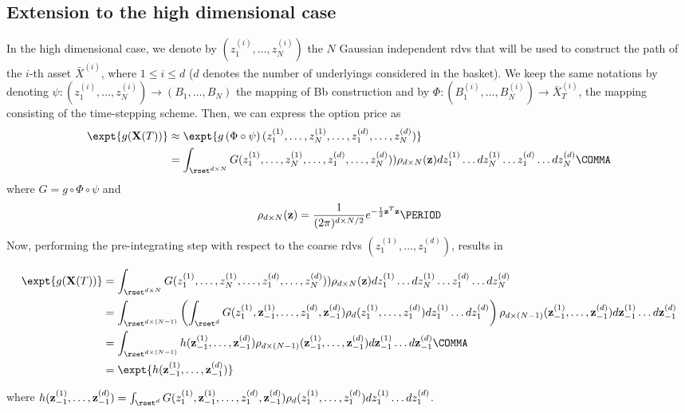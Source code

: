 \subsection{Extension to the high dimensional case}
In the high dimensional case, we denote by $(z_1^{(i)},\dots,z_N^{(i)})$ the $N$ Gaussian independent rdvs that will be used to construct the path of the $i$-th asset $\bar{X}^{(i)}$, where $1 \le i \le d$ ($d$ denotes the number of underlyings considered in the basket). We keep the  same notations by denoting  $\psi: (z_1^{(i)},\dots,z_N^{(i)}) \rightarrow (B_1,\dots,B_N)$ the mapping of Bb construction and by $\Phi: (B^{(i)}_1,\dots,B^{(i)}_N) \rightarrow \bar{X}^{(i)}_T$, the mapping consisting of the time-stepping scheme. Then, we can express the option price as
\begin{align*}
	\expt{g(\mathbf{X}(T))}&\approx	\expt{g\left(\Phi \circ \psi \right) (z_1^{(1)}, \dots, z_N^{(1)}, \dots, z_1^{(d)},\dots,z^{(d)}_N)} \nonumber\\
	&=\int_{\rset^{d \times N}} G(z_1^{(1)}, \dots, z_N^{(1)}, \dots, z_1^{(d)},\dots,z^{(d)}_N)) \rho_{d \times N}(\mathbf{z}) dz_1^{(1)} \dots dz_N^{(1)} \dots z_1^{(d)} \dots dz^{(d)}_N \COMMA
\end{align*}
where $G=g \circ \Phi \circ \psi$ and
\begin{equation*}
\rho_{d \times N}(\mathbf{z})=\frac{1}{(2 \pi)^{{d \times N}/2}} e^{-\frac{1}{2} \mathbf{z}^T \mathbf{z}} \PERIOD
\end{equation*}
Now,  performing the  pre-integrating step with respect to the coarse rdvs $(z_1^{(1)},\dots, z_1^{(d)} )$, results in
\begin{small}
\begin{align}\label{eq: pre_integration_step_wrt_y1_basket}
	\expt{g(\mathbf{X}(T))}&=\int_{\rset^{d \times N}} G(z_1^{(1)}, \dots, z_N^{(1)}, \dots, z_1^{(d)},\dots,z^{(d)}_N)) \rho_{d \times N}(\mathbf{z}) dz_1^{(1)} \dots dz_N^{(1)} \dots z_1^{(d)} \dots dz^{(d)}_N \nonumber\\ 
	&=\int_{\rset^{d \times (N-1)}} \left(\int_{\rset^d} G(z^{(1)}_1,\mathbf{z}^{(1)}_{-1},\dots,z^{(d)}_1,\mathbf{z}^{(d)}_{-1} ) \rho_d(z_1^{(1)},\dots,z_1^{(d)}) dz_1^{(1)}\dots dz_1^{(d)}  \right) \rho_{d \times(N-1)}(\mathbf{z}_{-1}^{(1)},\dots,\mathbf{z}_{-1}^{(d)}) d\mathbf{z}_{-1}^{(1)}\dots d\mathbf{z}_{-1}^{(d)}\nonumber\\	
	&=\int_{\rset^{d\times (N-1)}} h(\mathbf{z}^{(1)}_{-1},\dots,\mathbf{z}^{(d)}_{-1} ) \rho_{d\times (N-1)}(\mathbf{z}_{-1}^{(1)},\dots,\mathbf{z}_{-1}^{(d)}) d\mathbf{z}^{(1)}_{-1} \dots d\mathbf{z}^{(d)}_{-1}\COMMA \\ \nonumber
	&=\expt{h(\mathbf{z}^{(1)}_{-1},\dots,\mathbf{z}^{(d)}_{-1} )}
\end{align}
\end{small}
where $h(\mathbf{z}^{(1)}_{-1},\dots,\mathbf{z}^{(d)}_{-1})=\int_{\rset^d} G(z^{(1)}_1,\mathbf{z}^{(1)}_{-1},\dots,z^{(d)}_1,\mathbf{z}^{(d)}_{-1} )   \rho_d(z_1^{(1)},\dots,z_1^{(d)}) dz_1^{(1)}\dots dz_1^{(d)}$.

